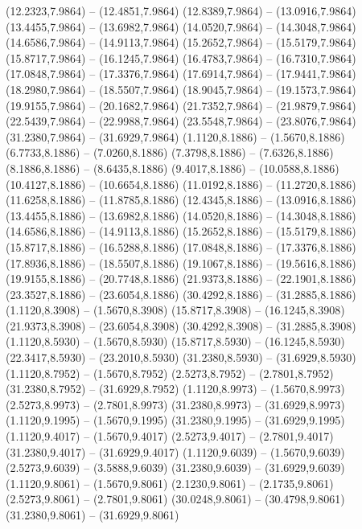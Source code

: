 {\begin{scope}[shift={(#1,#2)}]
    (12.2323,7.9864) -- (12.4851,7.9864)
    (12.8389,7.9864) -- (13.0916,7.9864)
    (13.4455,7.9864) -- (13.6982,7.9864)
    (14.0520,7.9864) -- (14.3048,7.9864)
    (14.6586,7.9864) -- (14.9113,7.9864)
    (15.2652,7.9864) -- (15.5179,7.9864)
    (15.8717,7.9864) -- (16.1245,7.9864)
    (16.4783,7.9864) -- (16.7310,7.9864)
    (17.0848,7.9864) -- (17.3376,7.9864)
    (17.6914,7.9864) -- (17.9441,7.9864)
    (18.2980,7.9864) -- (18.5507,7.9864)
    (18.9045,7.9864) -- (19.1573,7.9864)
    (19.9155,7.9864) -- (20.1682,7.9864)
    (21.7352,7.9864) -- (21.9879,7.9864)
    (22.5439,7.9864) -- (22.9988,7.9864)
    (23.5548,7.9864) -- (23.8076,7.9864)
    (31.2380,7.9864) -- (31.6929,7.9864)
    (1.1120,8.1886) -- (1.5670,8.1886)
    (6.7733,8.1886) -- (7.0260,8.1886)
    (7.3798,8.1886) -- (7.6326,8.1886)
    (8.1886,8.1886) -- (8.6435,8.1886)
    (9.4017,8.1886) -- (10.0588,8.1886)
    (10.4127,8.1886) -- (10.6654,8.1886)
    (11.0192,8.1886) -- (11.2720,8.1886)
    (11.6258,8.1886) -- (11.8785,8.1886)
    (12.4345,8.1886) -- (13.0916,8.1886)
    (13.4455,8.1886) -- (13.6982,8.1886)
    (14.0520,8.1886) -- (14.3048,8.1886)
    (14.6586,8.1886) -- (14.9113,8.1886)
    (15.2652,8.1886) -- (15.5179,8.1886)
    (15.8717,8.1886) -- (16.5288,8.1886)
    (17.0848,8.1886) -- (17.3376,8.1886)
    (17.8936,8.1886) -- (18.5507,8.1886)
    (19.1067,8.1886) -- (19.5616,8.1886)
    (19.9155,8.1886) -- (20.7748,8.1886)
    (21.9373,8.1886) -- (22.1901,8.1886)
    (23.3527,8.1886) -- (23.6054,8.1886)
    (30.4292,8.1886) -- (31.2885,8.1886)
    (1.1120,8.3908) -- (1.5670,8.3908)
    (15.8717,8.3908) -- (16.1245,8.3908)
    (21.9373,8.3908) -- (23.6054,8.3908)
    (30.4292,8.3908) -- (31.2885,8.3908)
    (1.1120,8.5930) -- (1.5670,8.5930)
    (15.8717,8.5930) -- (16.1245,8.5930)
    (22.3417,8.5930) -- (23.2010,8.5930)
    (31.2380,8.5930) -- (31.6929,8.5930)
    (1.1120,8.7952) -- (1.5670,8.7952)
    (2.5273,8.7952) -- (2.7801,8.7952)
    (31.2380,8.7952) -- (31.6929,8.7952)
    (1.1120,8.9973) -- (1.5670,8.9973)
    (2.5273,8.9973) -- (2.7801,8.9973)
    (31.2380,8.9973) -- (31.6929,8.9973)
    (1.1120,9.1995) -- (1.5670,9.1995)
    (31.2380,9.1995) -- (31.6929,9.1995)
    (1.1120,9.4017) -- (1.5670,9.4017)
    (2.5273,9.4017) -- (2.7801,9.4017)
    (31.2380,9.4017) -- (31.6929,9.4017)
    (1.1120,9.6039) -- (1.5670,9.6039)
    (2.5273,9.6039) -- (3.5888,9.6039)
    (31.2380,9.6039) -- (31.6929,9.6039)
    (1.1120,9.8061) -- (1.5670,9.8061)
    (2.1230,9.8061) -- (2.1735,9.8061)
    (2.5273,9.8061) -- (2.7801,9.8061)
    (30.0248,9.8061) -- (30.4798,9.8061)
    (31.2380,9.8061) -- (31.6929,9.8061)

\end{scope}}
